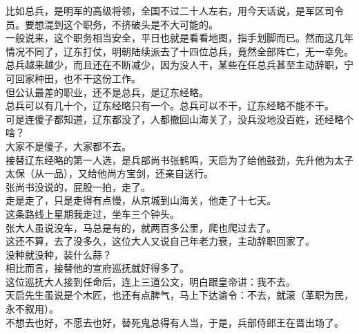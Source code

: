 \begin{multicols}{\theparacolNo}
比如总兵，是明军的高级将领，全国不过二十人左右，用今天话说，是军区司令员。要想混到这个职务，不挤破头是不大可能的。\\

一般说来，这个职务相当安全，平日也就是看看地图，指手划脚而已。然而这几年情况不同了，辽东打仗，明朝陆续派去了十四位总兵，竟然全部阵亡，无一幸免。\\

总兵越来越少，而且还在不断减少，因为没人干，某些在任总兵甚至主动辞职，宁可回家种田，也不干这份工作。\\

但公认最差的职业，还不是总兵，是辽东经略。\\

总兵可以有几十个，辽东经略只有一个。总兵可以不干，辽东经略不能不干。\\

可是连傻子都知道，辽东都没了，人都撤回山海关了，没兵没地没百姓，还经略个啥？\\

大家不是傻子，大家都不去。\\

接替辽东经略的第一人选，是兵部尚书张鹤鸣，天启为了给他鼓劲，先升他为太子太保（从一品），又给他尚方宝剑，还亲自送行。\\

张尚书没说的，屁股一拍，走了。\\

走是走了，只是走得有点慢，从京城到山海关，他走了十七天。\\

这条路线上星期我走过，坐车三个钟头。\\

张大人虽说没车，马总是有的，就两百多公里，爬也爬过去了。\\

这还不算，去了没多久，这位大人又说自己年老力衰，主动辞职回家了。\\

没种就没种，装什么蒜？\\

相比而言，接替他的宣府巡抚就好得多了。\\

这位巡抚大人接到任命后，连上三道公文，明白跟皇帝讲：我不去。\\

天启先生虽说是个木匠，也还有点脾气，马上下达谕令：不去，就滚（革职为民，永不叙用）。\\

不想去也好，不愿去也好，替死鬼总得有人当，于是，兵部侍郎王在晋出场了。\\


\end{multicols}
